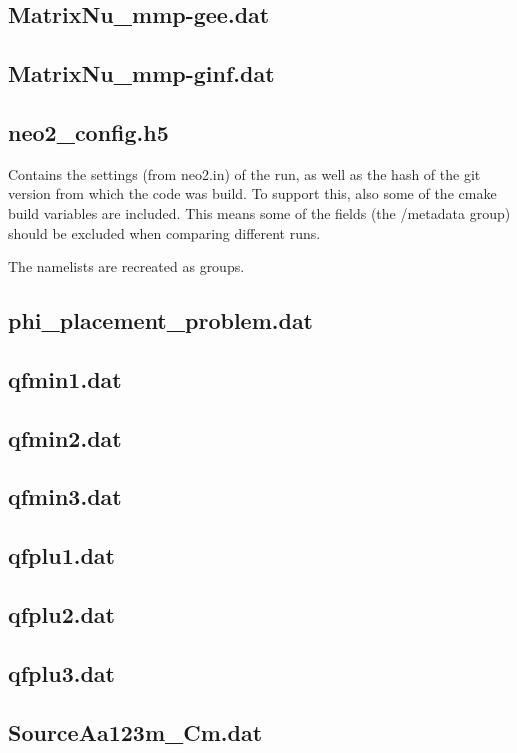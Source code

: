\subsection{MatrixNu\_mmp-gee.dat}
\subsection{MatrixNu\_mmp-ginf.dat}

\subsection{neo2\_config.h5}
Contains the settings (from neo2.in) of the run, as well as the hash of
the git version from which the code was build. To support this, also
some of the cmake build variables are included.
This means some of the fields (the /metadata group) should be
excluded when comparing different runs.

The namelists are recreated as groups.

\subsection{phi\_placement\_problem.dat}

\subsection{qfmin1.dat}
\subsection{qfmin2.dat}
\subsection{qfmin3.dat}
\subsection{qfplu1.dat}
\subsection{qfplu2.dat}
\subsection{qfplu3.dat}

\subsection{SourceAa123m\_Cm.dat}

